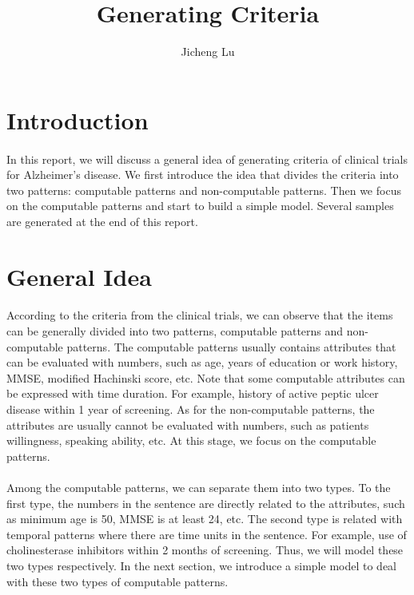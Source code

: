 \documentclass{article}
\title{Generating Criteria}
\author{Jicheng Lu}
\date{}
\begin{document}
\maketitle

\section{Introduction}
\paragraph{}
In this report, we will discuss a general idea of generating criteria of clinical trials for Alzheimer's disease. We first introduce the idea that divides the criteria into two patterns: computable patterns and non-computable patterns. Then we focus on the  computable patterns and  start to build a simple model. Several samples are generated at the end of this report.  \\

\section{General Idea}
\paragraph{}
According to the criteria from the clinical trials, we can observe that the items can be generally divided into two patterns, computable patterns and non-computable patterns. The computable patterns usually contains attributes that can be evaluated with numbers, such as age, years of education or work history, MMSE, modified Hachinski score, etc. Note that some computable attributes can be expressed with time duration. For example, history of active peptic ulcer disease within 1 year of screening. As for the non-computable patterns, the attributes are usually cannot be evaluated with numbers, such as patients willingness, speaking ability, etc. At this stage, we focus on the computable patterns. \\
\\
Among the computable patterns, we can separate them into two types. To the first type, the numbers in the sentence are directly related to the attributes, such as minimum age is 50, MMSE is at least 24, etc. The second type is related with temporal patterns where there are time units in the sentence. For example, use of cholinesterase inhibitors within 2 months of screening. Thus, we will model these two types respectively. In the next section, we introduce a simple model to deal with these two types of computable patterns. \\
\end{document}
